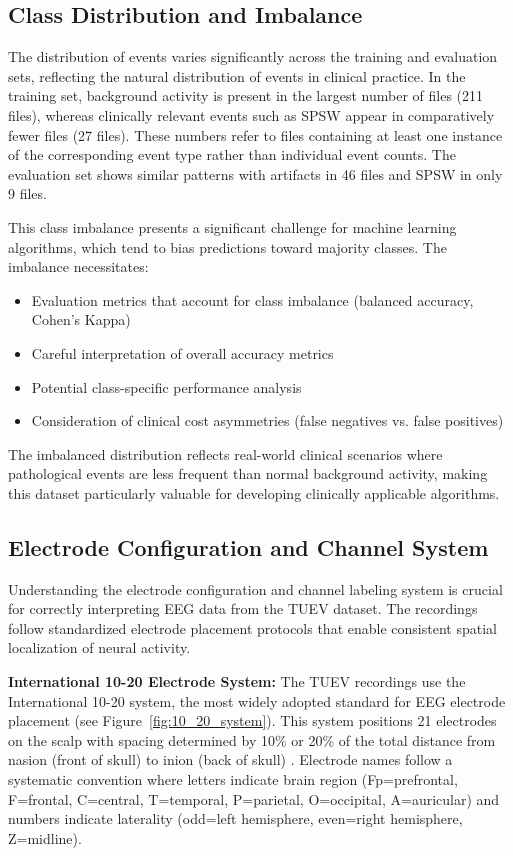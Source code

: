 \subsection{Class Distribution and Imbalance}
\label{sec:class_distribution}

The distribution of events varies significantly across the training and evaluation sets, reflecting the natural distribution of events in clinical practice. In the training set, background activity is present in the largest number of files (211 files), whereas clinically relevant events such as \ac{SPSW} appear in comparatively fewer files (27 files). These numbers refer to files containing at least one instance of the corresponding event type rather than individual event counts. The evaluation set shows similar patterns with artifacts in 46 files and \ac{SPSW} in only 9 files.

This class imbalance presents a significant challenge for machine learning algorithms, which tend to bias predictions toward majority classes. The imbalance necessitates:
\begin{itemize}
    \item Evaluation metrics that account for class imbalance (balanced accuracy, Cohen's Kappa)
    \item Careful interpretation of overall accuracy metrics
    \item Potential class-specific performance analysis
    \item Consideration of clinical cost asymmetries (false negatives vs. false positives)
\end{itemize}

The imbalanced distribution reflects real-world clinical scenarios where pathological events are less frequent than normal background activity, making this dataset particularly valuable for developing clinically applicable algorithms.

\subsection{Electrode Configuration and Channel System}
\label{sec:electrode_configuration}

Understanding the electrode configuration and channel labeling system is crucial for correctly interpreting \ac{EEG} data from the \ac{TUEV} dataset. The recordings follow standardized electrode placement protocols that enable consistent spatial localization of neural activity.

\textbf{International 10-20 Electrode System:} The \ac{TUEV} recordings use the International 10-20 system, the most widely adopted standard for \ac{EEG} electrode placement (see Figure~\ref{fig:10_20_system}). This system positions 21 electrodes on the scalp with spacing determined by 10\% or 20\% of the total distance from nasion (front of skull) to inion (back of skull) \cite{ferrell2022electrode}. Electrode names follow a systematic convention where letters indicate brain region (Fp=prefrontal, F=frontal, C=central, T=temporal, P=parietal, O=occipital, A=auricular) and numbers indicate laterality (odd=left hemisphere, even=right hemisphere, Z=midline).

